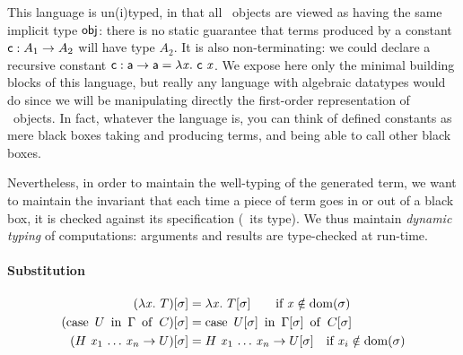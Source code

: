 \documentclass[9pt]{sigplanconf}
\begin{document}
This language is un(i)typed, in that all \LF\ objects are viewed as
having the same implicit type $\text{\textsf{obj}}$: there is no static
guarantee that terms produced by a constant $\text{\textsf{c}} : A_1\to A_2$ will
have type $A_2$. It is also non-terminating: we could declare a
recursive constant $\text{\textsf{c}} : \text{\textsf{a}}\to \text{\textsf{a}} = \lambda{\ensuremath{\text{\textit{x}}}}.\  {\text{\textsf{c}}}\ 
{\text{\textit{x}}}$. We expose here only the minimal building blocks of this
language, but really any language with algebraic datatypes would do
since we will be manipulating directly the first-order representation
of \LF\ objects. In fact, whatever the language is, you can think of
defined constants as mere black boxes taking and producing terms, and
being able to call other black boxes.

Nevertheless, in order to maintain the well-typing of the generated
term, we want to maintain the invariant that each time a piece of term
goes in or out of a black box, it is checked against its specification
(\ie\ its type). We thus maintain \emph{dynamic typing} of
computations: arguments and results are type-checked at run-time.

\paragraph{Substitution}

\begin{align*}
  {(\lambda{\ensuremath{\text{\textit{x}}}}.\ T)}[{\sigma}] &= \lambda{\ensuremath{\text{\textit{x}}}}.\  {{T}[{\sigma}]} \qquad
  \text{if $\text{\textit{x}}\notin\operatorname{dom}{\!(\sigma)}$}\\
  {(\operatorname{case}\ {{U}\ \operatorname{in}\ {\Gamma}}\ \operatorname{of}\  C)}[{\sigma}] &=
  \operatorname{case}\ {{{U}[{\sigma}]}\ \operatorname{in}\ {{\Gamma}[{\sigma}]}}\ \operatorname{of}\  {{C}[{\sigma}]} \\
  {({{H}\  {{\text{\textit{x}}_1}\ {{\ldots}\ {\text{\textit{x}}_n}}}}\to U)}[{\sigma}] &= {{{H}\  {{\text{\textit{x}}_1}\ {{\ldots}\ {\text{\textit{x}}_n}}}}\to {U}[{\sigma}]} \quad \text{if $\text{\textit{x}}_i\notin\operatorname{dom}{\!(\sigma)}$} \\
\end{align*}
\end{document}
